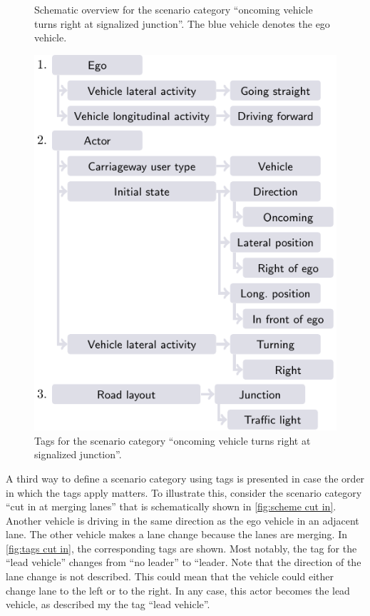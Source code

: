 \documentclass[twoside,twocolumn,9pt]{extarticle}
\newlength\figurewidth
\theoremstyle{plain}
\begin{document}
\setlength{\figurewidth}{15.0em}
\begin{figure}
	\centering
	
	\caption{Schematic overview for the scenario category ``oncoming vehicle turns right at signalized junction''. The blue vehicle denotes the ego vehicle.}
	\label{fig:scheme oncoming turning}
\end{figure}
\begin{figure}
	\centering
	\includegraphics{oncoming_turning}
	\caption{Tags for the scenario category ``oncoming vehicle turns right at signalized junction''.}
	\label{fig:tags oncoming turning}
\end{figure}

A third way to define a scenario category using tags is presented in case the order in which the tags apply matters. To illustrate this, consider the scenario category ``cut in at merging lanes'' that is schematically shown in \cref{fig:scheme cut in}. 
Another vehicle is driving in the same direction as the ego vehicle in an adjacent lane. The other vehicle makes a lane change because the lanes are merging. In \cref{fig:tags cut in}, the corresponding tags are shown. Most notably, the tag for the ``lead vehicle'' changes from ``no leader'' to ``leader. Note that the direction of the lane change is not described. This could mean that the vehicle could either change lane to the left or to the right. In any case, this actor becomes the lead vehicle, as described my the tag ``lead vehicle''. 
\end{document}

